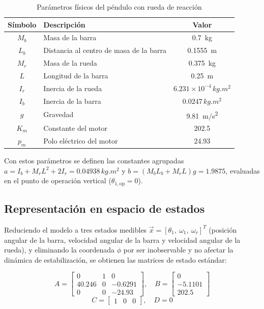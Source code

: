 \documentclass[conference]{IEEEtran}
\begin{document}
\begin{table}[H]
\centering
\caption{Parámetros físicos del péndulo con rueda de reacción}
\label{tab:parametros}
\renewcommand{\arraystretch}{1.3}
\begin{tabular}{|c|l|c|}
\hline
\textbf{Símbolo} & \textbf{Descripción} & \textbf{Valor} \\
\hline
$M_b$ & Masa de la barra & \SI{0.7}{kg} \\
\hline
$L_b$ & Distancia al centro de masa de la barra & \SI{0.1555}{m} \\
\hline
$M_r$ & Masa de la rueda & \SI{0.375}{kg} \\
\hline
$L$ & Longitud de la barra & \SI{0.25}{m} \\
\hline
$I_r$ & Inercia de la rueda & $6.231\times10^{-4}\,\si{kg.m^2}$ \\
\hline
$I_b$ & Inercia de la barra & $0.0247\,\si{kg.m^2}$ \\
\hline
$g$ & Gravedad & \SI{9.81}{m/s^2} \\
\hline
$K_m$ & Constante del motor & 202.5 \\
\hline
$p_m$ & Polo eléctrico del motor & 24.93 \\
\hline
\end{tabular}
\end{table}

Con estos parámetros se definen las constantes agrupadas $a = I_b + M_r L^2 + 2I_r = 0.04938\,\si{kg.m^2}$ y $b=(M_b L_b + M_r L)g = 1.9875$, evaluadas en el punto de operación vertical ($\theta_{1,\text{op}}=0$).

\subsection{Representación en espacio de estados}

Reduciendo el modelo a tres estados medibles $\vec{x} = [\theta_1,\ \omega_1,\ \omega_r]^T$ (posición angular de la barra, velocidad angular de la barra y velocidad angular de la rueda), y eliminando la coordenada $\phi$ por ser inobservable y no afectar la dinámica de estabilización, se obtienen las matrices de estado estándar:

\begin{equation}
A = \begin{bmatrix} 0 & 1 & 0 \\ 40.246 & 0 & -0.6291 \\ 0 & 0 & -24.93 \end{bmatrix},\quad
B = \begin{bmatrix} 0 \\ -5.1101 \\ 202.5 \end{bmatrix}
\end{equation}
\begin{equation}
C = \begin{bmatrix} 1 & 0 & 0 \end{bmatrix}, \quad D = 0
\end{equation}
\end{document}
